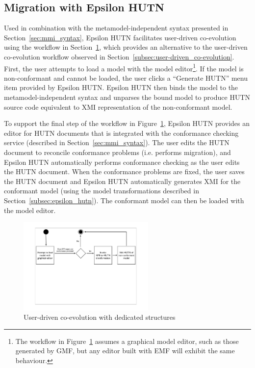 \subsection{Migration with Epsilon HUTN}
\label{subsec:migration_with_hutn}
Used in combination with the metamodel-independent syntax presented in Section~\ref{sec:mmi_syntax}, Epsilon HUTN facilitates user-driven co-evolution using the workflow in Section~\ref{fig:hutn_process_implementation}, which provides an alternative to the user-driven co-evolution workflow observed in Section~\ref{subsec:user-driven_co-evolution}. First, the user attempts to load a model with the model editor\footnote{The workflow in Figure~\ref{fig:hutn_process_implementation} assumes a graphical model editor, such as those generated by GMF, but any editor built with  EMF will exhibit the same behaviour.}. If the model is non-conformant and cannot be loaded, the user clicks a ``Generate HUTN'' menu item provided by Epsilon HUTN. Epsilon HUTN then binds the model to the metamodel-independent syntax and unparses the bound model to produce HUTN source code equivalent to XMI representation of the non-conformant model.

To support the final step of the workflow in Figure~\ref{fig:hutn_process_implementation}, Epsilon HUTN provides an editor for HUTN documents that is integrated with the conformance checking service (described in Section~\ref{sec:mmi_syntax}). The user edits the HUTN document to reconcile conformance problems (i.e. performs migration), and Epsilon HUTN automatically performs conformance checking as the user edits the HUTN document. When the conformance problems are fixed, the user saves the HUTN document and Epsilon HUTN automatically generates XMI for the conformant model (using the model transformations described in Section~\ref{subsec:epsilon_hutn}). The conformant model can then be loaded with the model editor.

\begin{figure}[htbp]
	\centering
	\includegraphics*[viewport=80 290 760 550,height=4.75cm]{6.Evaluation/images/user_driven/hutn_process.pdf}
	\caption{User-driven co-evolution with dedicated structures}
	\label{fig:hutn_process_implementation}
\end{figure}

